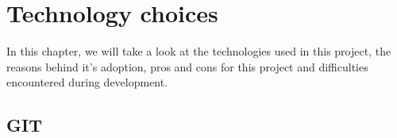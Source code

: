 \chapter{Technology choices}

  In this chapter, we will take a look at the technologies used in this project,
  the reasons behind it's adoption, pros and cons for this project and
  difficulties encountered during development.

  
  
  
  
  \section{GIT}

